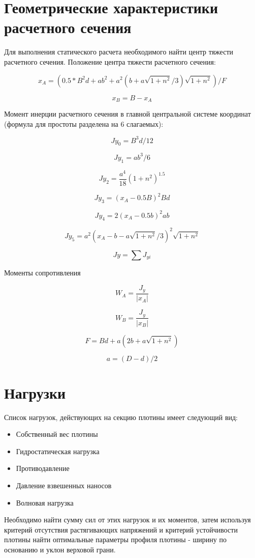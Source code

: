 \documentclass[12pt,a4paper,oneside,draft,titlepage]{article}
\begin{document}
\section{Геометрические характеристики расчетного сечения}

Для выполнения статического расчета необходимого найти центр тяжести расчетного сечения.
Положение центра тяжести расчетного сечения:

$$ x_A = (0.5 * B ^ 2  d + a  b ^ 2 + a ^ 2  (b + a  \sqrt{1 + n ^ 2} / 3)  \sqrt{1 + n ^ 2}) / F $$

$$ x_B = B - x_A $$

Момент инерции расчетного сечения в главной центральной системе координат (формула для простоты разделена на 6 слагаемых):

$$ Jy_0 = B ^ 3  d / 12 $$

$$ Jy_1 = a  b ^ 3 / 6 $$

$$ Jy_2 = \frac {a ^ 4}{18} (1 + n ^ 2) ^ {1.5} $$

$$ Jy_3 = (x_A - 0.5  B) ^ 2  B  d $$

$$ Jy_4 = 2  (x_A - 0.5  b) ^ 2  a  b $$

$$ Jy_5 = a ^ 2 (x_A - b - a  \sqrt{1 + n ^ 2} / 3) ^ 2  \sqrt{1 + n ^ 2} $$

$$ Jy = \sum J_{yi} $$

Моменты сопротивления

$$W_A = \frac{J_y}{|x_A|}$$

$$W_B = \frac{J_y}{|x_B|}$$

$$F = B d + a (2  b + a  \sqrt{1 + n ^ 2})$$

$$a = (D - d) / 2 $$

\section{Нагрузки}

Список нагрузок, действующих на секцию плотины имеет следующий вид:

\begin{itemize}
	\item Собственный вес плотины
	\item Гидростатическая нагрузка
	\item Противодавление
	\item Давление взвешенных наносов
	\item Волновая нагрузка
\end{itemize}

Необходимо найти сумму сил от этих нагрузок и их моментов, затем используя критерий отсутствия растягивающих напряжений и критерий устойчивости плотины найти оптимальные параметры профиля плотины - ширину по основанию и уклон верховой грани.
\end{document}
